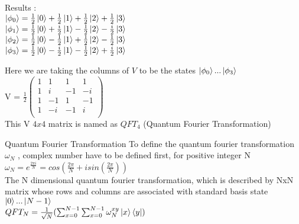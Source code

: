 \documentclass[12pt]{beamer}
\begin{document}
\begin{frame}
Results :\\
\vspace{1cm}
$\ket{\phi_0} = \frac{1}{2}\ket{0}+\frac{1}{2}\ket{1}+\frac{1}{2}\ket{2}+\frac{1}{2}\ket{3}$\\
\vspace{0.5cm}
$\ket{\phi_1} = \frac{1}{2}\ket{0}+\frac{i}{2}\ket{1}-\frac{1}{2}\ket{2}-\frac{i}{2}\ket{3}$\\
\vspace{0.5cm}
$\ket{\phi_2} = \frac{1}{2}\ket{0}-\frac{1}{2}\ket{1}+\frac{1}{2}\ket{2}-\frac{1}{2}\ket{3}$\\
\vspace{0.5cm}
$\ket{\phi_3} = \frac{1}{2}\ket{0}-\frac{i}{2}\ket{1}-\frac{1}{2}\ket{2}+\frac{i}{2}\ket{3}$\\
\vspace{0.5cm}
\end{frame}
\begin{frame}
Here we are taking the columns of $V$ to be the states $\ket{\phi_0} . . . \ket{\phi_3}$\\
\vspace{1cm}
V = $\frac{1}{2}
\begin{pmatrix}
1 & 1 & 1 & 1\\
1 & i & -1 & -i\\
1 & -1 & 1 & -1\\
1 & -i & -1 & i\\
\end{pmatrix}$\\
\vspace{1cm}
This V $4x4$ matrix is named as $QFT_4$ (Quantum Fourier Transformation)
\end{frame}
\begin{frame}{Quantum Fourier Transformation}
To define the quantum fourier transformation $\omega_N$ , complex number have to be defined first, for positive integer N\\
\vspace{1cm}
$\omega_N = e^{\frac{2\pi i}{N}} = cos(\frac{2\pi}{N}+ i sin(\frac{2\pi}{N}))$\\
\vspace{1cm}
The N dimensional quantum fourier transformation, which is described by NxN matrix whose rows and columns are associated with standard basis state 
$\ket{0}...\ket{N-1}$\\
\vspace{1cm}
$QFT_N = \frac{1}{\sqrt N}(\sum_{x=0}^{N-1}\sum_{x=0}^{N-1}\omega_{N}^{xy}\ket{x}\bra{y})$\\
\end{frame}
\end{document}
